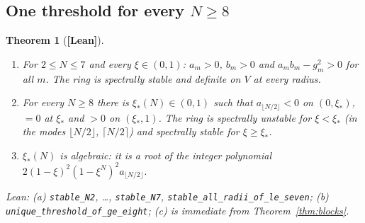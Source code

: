 \documentclass[11pt]{article}
\newtheorem{theorem}{Theorem}[section]
\theoremstyle{definition}
\theoremstyle{remark}
\newcommand{\st}[1]{\textbf{[#1]}}
\newcommand{\lean}[1]{\nolinkurl{#1}}
\begin{document}
\subsection{\texorpdfstring{One threshold for every $N\ge8$}{One threshold for every N >= 8}}
\begin{theorem}[\st{Lean}]\label{thm:unique}
\begin{enumerate}
\item[(a)] For $2\le N\le7$ and every $\xi\in(0,1)$: $a_m>0$, $b_m>0$ and $a_mb_m-g_m^2>0$ for all $m$. The ring is spectrally
stable and definite on $V$ at every radius.
\item[(b)] For every $N\ge8$ there is $\xi_*(N)\in(0,1)$ such that $a_{\lfloor N/2\rfloor}<0$ on $(0,\xi_*)$, $=0$ at $\xi_*$ and $>0$
on $(\xi_*,1)$. The ring is spectrally unstable for $\xi<\xi_*$ (in the modes $\lfloor N/2\rfloor$, $\lceil N/2\rceil$) and
spectrally stable for $\xi\ge\xi_*$.
\item[(c)] $\xi_*(N)$ is algebraic: it is a root of the integer polynomial $2(1-\xi)^2(1-\xi^N)^2a_{\lfloor N/2\rfloor}$.
\end{enumerate}
Lean: (a) \lean{stable_N2}, \dots, \lean{stable_N7}, \lean{stable_all_radii_of_le_seven}; (b)
\lean{unique_threshold_of_ge_eight}; (c) is immediate from Theorem~\ref{thm:blocks}.
\end{theorem}
\end{document}
